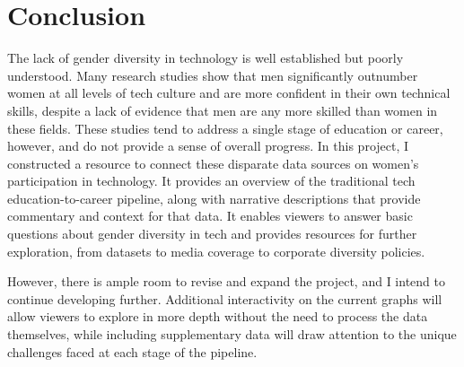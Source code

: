 {\color{magenta}
\section{Conclusion}\label{sec:conclusion}
The lack of gender diversity in technology is well established but poorly understood. Many research studies show that men significantly outnumber women at all levels of tech culture and are more confident in their own technical skills, despite a lack of evidence that men are any more skilled than women in these fields. These studies tend to address a single stage of education or career, however, and do not provide a sense of overall progress. In this project, I constructed a resource to connect these disparate data sources on women's participation in technology. It provides an overview of the traditional tech education-to-career pipeline, along with narrative descriptions that provide commentary and context for that data. It enables viewers to answer basic questions about gender diversity in tech and provides resources for further exploration, from datasets to media coverage to corporate diversity policies.

However, there is ample room to revise and expand the project, and I intend to continue developing further. Additional interactivity on the current graphs will allow viewers to explore in more depth without the need to process the data themselves, while including supplementary data will draw attention to the unique challenges faced at each stage of the pipeline.
}

